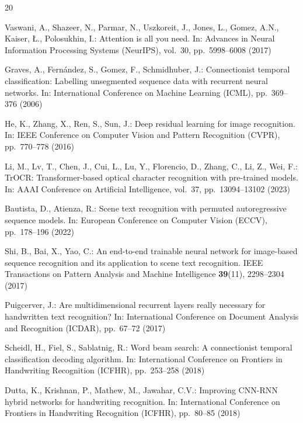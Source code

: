 \documentclass[pdflatex,sn-mathphys-num]{sn-jnl}
\begin{document}
\begin{thebibliography}{20}

Vaswani, A., Shazeer, N., Parmar, N., Uszkoreit, J., Jones, L., Gomez, A.N., Kaiser, {\L}., Polosukhin, I.: Attention is all you need. In: Advances in Neural Information Processing Systems (NeurIPS), vol.~30, pp.~5998--6008 (2017)

Graves, A., Fern{\'a}ndez, S., Gomez, F., Schmidhuber, J.: Connectionist temporal classification: Labelling unsegmented sequence data with recurrent neural networks. In: International Conference on Machine Learning (ICML), pp.~369--376 (2006)

He, K., Zhang, X., Ren, S., Sun, J.: Deep residual learning for image recognition. In: IEEE Conference on Computer Vision and Pattern Recognition (CVPR), pp.~770--778 (2016)

Li, M., Lv, T., Chen, J., Cui, L., Lu, Y., Florencio, D., Zhang, C., Li, Z., Wei, F.: TrOCR: Transformer-based optical character recognition with pre-trained models. In: AAAI Conference on Artificial Intelligence, vol.~37, pp.~13094--13102 (2023)

Bautista, D., Atienza, R.: Scene text recognition with permuted autoregressive sequence models. In: European Conference on Computer Vision (ECCV), pp.~178--196 (2022)

Shi, B., Bai, X., Yao, C.: An end-to-end trainable neural network for image-based sequence recognition and its application to scene text recognition. IEEE Transactions on Pattern Analysis and Machine Intelligence \textbf{39}(11), 2298--2304 (2017)

Puigcerver, J.: Are multidimensional recurrent layers really necessary for handwritten text recognition? In: International Conference on Document Analysis and Recognition (ICDAR), pp.~67--72 (2017)

Scheidl, H., Fiel, S., Sablatnig, R.: Word beam search: A connectionist temporal classification decoding algorithm. In: International Conference on Frontiers in Handwriting Recognition (ICFHR), pp.~253--258 (2018)

Dutta, K., Krishnan, P., Mathew, M., Jawahar, C.V.: Improving CNN-RNN hybrid networks for handwriting recognition. In: International Conference on Frontiers in Handwriting Recognition (ICFHR), pp.~80--85 (2018)


\end{thebibliography}
\end{document}
